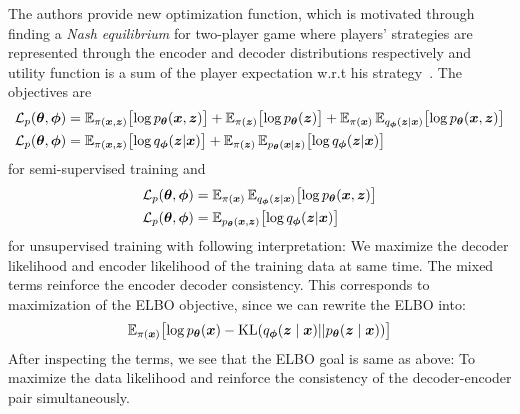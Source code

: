 The authors provide new optimization function, which is motivated through finding a \textit{Nash equilibrium} for two-player game 
where players' strategies are represented through the encoder and decoder distributions respectively and utility function is
a sum of the player expectation w.r.t his strategy~\cite{sym-learning-2023}. 
The objectives are 
\begin{align*}
    \mathcal{L}_{p}(\boldsymbol{\theta},\boldsymbol{\phi}) &= \operatorname{\mathbb{E}}_{\pi(\boldsymbol{x},\boldsymbol{z})}\bigl[\log p_{\boldsymbol{\theta}}(\boldsymbol{x},\boldsymbol{z})\bigr]+
                    \operatorname{\mathbb{E}}_{\pi(\boldsymbol{z})}\bigl[\log p_{\boldsymbol{\theta}}(\boldsymbol{z})\bigr] +
                    \operatorname{\mathbb{E}}_{\pi(\boldsymbol{x})}\operatorname{\mathbb{E}}_{q_{\boldsymbol{\phi}}(\boldsymbol{z} |\boldsymbol{x})}\bigl[\log p_{\boldsymbol{\theta}}(\boldsymbol{x},\boldsymbol{z})\bigr]\\
    \mathcal{L}_{p}(\boldsymbol{\theta},\boldsymbol{\phi}) &= \operatorname{\mathbb{E}}_{\pi(\boldsymbol{x},\boldsymbol{z})}\bigl[\log q_{\boldsymbol{\phi}}(\boldsymbol{z} | \boldsymbol{x})\bigr] + 
    \operatorname{\mathbb{E}}_{\pi(\boldsymbol{z})}\operatorname{\mathbb{E}}_{p_{\boldsymbol{\theta}}(\boldsymbol{x} |\boldsymbol{z})} \bigl[\log q_{\boldsymbol{\phi}}(\boldsymbol{z} | \boldsymbol{x})\bigr]
\end{align*}
for semi-supervised training and 
\begin{align}
    \mathcal{L}_{p}(\boldsymbol{\theta},\boldsymbol{\phi}) &= \operatorname{\mathbb{E}}_{\pi(\boldsymbol{x})}\operatorname{\mathbb{E}}_{q_{\boldsymbol{\phi}}(\boldsymbol{z} |\boldsymbol{x})}\bigl[\log p_{\boldsymbol{\theta}}(\boldsymbol{x},\boldsymbol{z})\bigr] \label{eq:unsup_objective_theta}\\
    \mathcal{L}_{p}(\boldsymbol{\theta},\boldsymbol{\phi}) &= \operatorname{\mathbb{E}}_{p_{\boldsymbol{\theta}}(\boldsymbol{x},\boldsymbol{z})} \bigl[\log q_{\boldsymbol{\phi}}(\boldsymbol{z} | \boldsymbol{x})\bigr] \label{eq:unsup_objective_phi}
\end{align}
for unsupervised training with following interpretation: We maximize the decoder likelihood and encoder likelihood of the training data at same time. The mixed 
terms reinforce the encoder decoder consistency. This corresponds to maximization of the ELBO objective, since we can 
rewrite the ELBO into:
$$
\operatorname{\mathbb{E}}_{\pi(\boldsymbol{x})} \bigl[ 
\log p_{\boldsymbol{\theta}}(\boldsymbol{x}) - \mathrm{KL} (q_{\boldsymbol{\phi}}(\boldsymbol{z} \mid \boldsymbol{x}) || 
p_{\boldsymbol{\theta}}(\boldsymbol{z} \mid \boldsymbol{x})) \bigr]
$$
After inspecting the terms, we see that the ELBO goal is same as above: To maximize the data likelihood and reinforce the consistency of the decoder-encoder pair 
simultaneously. 
